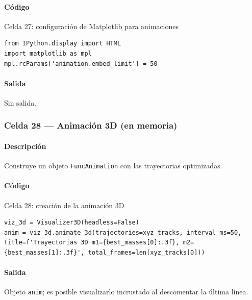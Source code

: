 \paragraph{Código}
\begin{listing}[H]
\caption{Celda 27: configuración de Matplotlib para animaciones}
\begin{adjustbox}{max width=\textwidth}
\begin{minipage}{\textwidth}
\begin{verbatim}
from IPython.display import HTML
import matplotlib as mpl
mpl.rcParams['animation.embed_limit'] = 50
\end{verbatim}
\end{minipage}
\end{adjustbox}
\end{listing}
\paragraph{Salida} Sin salida.

\subsubsection*{Celda 28 — Animación 3D (en memoria)}
\paragraph{Descripción} Construye un objeto \texttt{FuncAnimation} con las trayectorias optimizadas.
\paragraph{Código}
\begin{listing}[H]
\caption{Celda 28: creación de la animación 3D}
\begin{adjustbox}{max width=\textwidth}
\begin{minipage}{\textwidth}
\begin{verbatim}
viz_3d = Visualizer3D(headless=False)
anim = viz_3d.animate_3d(trajectories=xyz_tracks, interval_ms=50, title=f'Trayectorias 3D m1={best_masses[0]:.3f}, m2={best_masses[1]:.3f}', total_frames=len(xyz_tracks[0]))
\end{verbatim}
\end{minipage}
\end{adjustbox}
\end{listing}
\paragraph{Salida} Objeto \texttt{anim}; es posible visualizarlo incrustado al descomentar la última línea.

